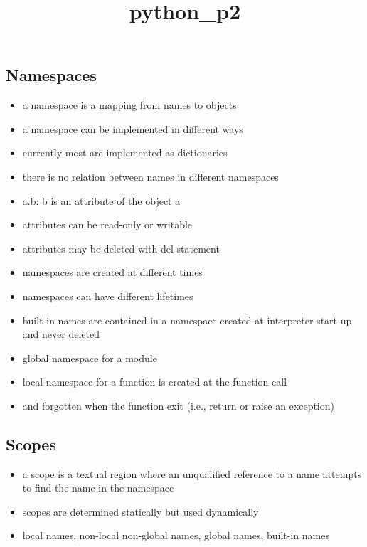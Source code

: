 \documentclass[11pt]{article}
\title{python\_p2}
\providecommand{\tightlist}{%
      \setlength{\itemsep}{0pt}\setlength{\parskip}{0pt}}
\begin{document}
    
    \maketitle
    
    

    
    \hypertarget{namespaces}{%
\subsection{Namespaces}\label{namespaces}}

\begin{itemize}
\tightlist
\item
  a namespace is a mapping from names to objects
\item
  a namespace can be implemented in different ways
\item
  currently most are implemented as dictionaries
\item
  there is no relation between names in different namespaces
\item
  a.b: b is an attribute of the object a
\item
  attributes can be read-only or writable
\item
  attributes may be deleted with del statement
\item
  namespaces are created at different times
\item
  namespaces can have different lifetimes
\item
  built-in names are contained in a namespace created at interpreter
  start up and never deleted
\item
  global namespace for a module
\item
  local namespace for a function is created at the function call
\item
  and forgotten when the function exit (i.e., return or raise an
  exception)
\end{itemize}

\hypertarget{scopes}{%
\subsection{Scopes}\label{scopes}}

\begin{itemize}
\tightlist
\item
  a scope is a textual region where an unqualified reference to a name
  attempts to find the name in the namespace
\item
  scopes are determined statically but used dynamically
\item
  local names, non-local non-global names, global names, built-in names
\end{itemize}
\end{document}
